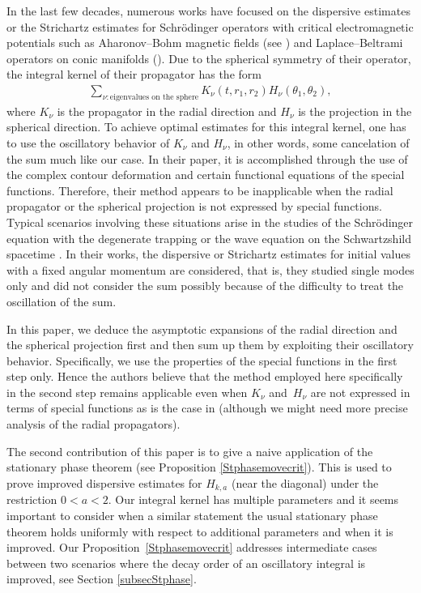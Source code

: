 \documentclass[pdftex]{sigma}
\numberwithin{equation}{section}
\def\n{\nu}
\begin{document}
In the last few decades, numerous works have focused on the dispersive estimates or the Strichartz estimates for Schr\"odinger operators with critical electromagnetic potentials such as Aharonov--Bohm magnetic fields (see \cite{FFFP1,FFFP2,FZZ,GYZZ}) and Laplace--Beltrami operators on conic manifolds (\cite{F,ZZ}). Due to the spherical symmetry of their operator, the integral kernel of their propagator has the form
\begin{align*}
\sum_{\n\colon \text{eigenvalues on the sphere}}K_{\n}(t,r_1,r_2)H_{\n}(\theta_1,\theta_2),
\end{align*}
where $K_{\n}$ is the propagator in the radial direction and $H_{\n}$ is the projection in the spherical direction. To achieve optimal estimates for this integral kernel, one has to use the oscillatory behavior of $K_{\n}$ and $H_{\n}$, in other words, some cancelation of the sum much like our case. In their paper, it is accomplished through the use of the complex contour deformation and certain functional equations of the special functions.
Therefore, their method appears to be inapplicable when the radial propagator or the spherical projection is not expressed by special functions. Typical scenarios involving these situations arise in the studies of the Schr\"odinger equation with the degenerate trapping \cite{C} or the wave equation on the Schwartzshild spacetime \cite{DSS}. In their works, the dispersive or Strichartz estimates for initial values with a fixed angular momentum are considered, that is, they studied single modes only and did not consider the sum possibly because of the difficulty to treat the oscillation of the sum.

In this paper, we deduce the asymptotic expansions of the radial direction and the spherical projection first and then sum up them by exploiting their oscillatory behavior. Specifically, we use the properties of the special functions in the first step only. Hence the authors believe that the method employed here specifically in the second step remains applicable even when $K_{\n}$ and~$H_{\n}$ are not expressed in terms of special functions as is the case in \cite{C,DSS} (although we might need more precise analysis of the radial propagators).

The second contribution of this paper is to give a naive application of the stationary phase theorem (see Proposition \ref{Stphasemovecrit}). This is used to prove improved dispersive estimates for $H_{k,a}$ (near the diagonal) under the restriction $0<a<2$. Our integral kernel has multiple parameters and it seems important to consider when a similar statement the usual stationary phase theorem holds uniformly with respect to additional parameters and when it is improved. Our Proposition~\ref{Stphasemovecrit} addresses intermediate cases between two scenarios where the decay order of an oscillatory integral is improved, see Section \ref{subsecStphase}.
\end{document}
